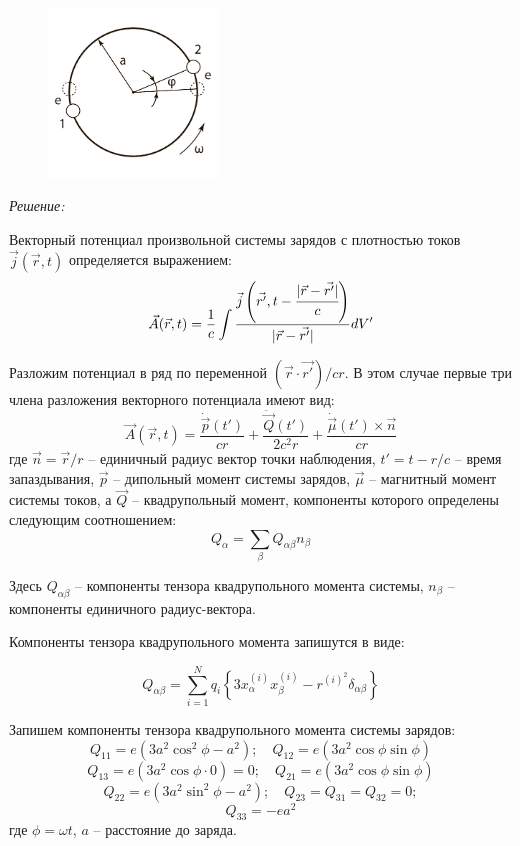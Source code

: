 \begin{figure}[ht]
    \center
	\includegraphics[width=0.4\textwidth]{pdf/02.pdf}
\end{figure}

\emph{Решение:}

Векторный потенциал произвольной системы зарядов с плотностью 
токов \( \vec{j}(\vec{r}, t) \) определяется выражением:
\[ 
	\vec{A}(\vec{r}, t) = \frac{1}{c}\int
	\frac{\vec{j}\left(\vec{r'}, t - \cfrac{|\vec{r}-\vec{r'}|}{c}\right)}
	{|\vec{r} - \vec{r'}|}dV'
\]

Разложим потенциал в ряд по переменной \( (\vec{r}\cdot\vec{r'})/cr \). 
В этом случае первые три члена разложения векторного потенциала имеют вид:
\[
	\vec{A}(\vec{r}, t) = \frac{\dot{\vec{p}}(t')}{cr} + 
	\frac{\ddot{\vec{Q}}(t')}{2c^2 r} + 
	\frac{\dot{\vec{\mu}}(t')\times\vec{n}}{cr}
\]
где \( \vec{n} = \vec{r}/r \) -- единичный радиус вектор точки наблюдения, 
\( t' = t - r/c \) -- время запаздывания, 
\( \vec{p} \) -- дипольный момент системы зарядов,
\( \vec{\mu} \) -- магнитный момент системы токов, а 
\( \vec{Q} \) -- квадрупольный момент, компоненты которого определены 
следующим соотношением:
\[ Q_\alpha = \sum_\beta Q_{\alpha\beta}n_\beta \]

Здесь \( Q_{\alpha\beta} \) -- компоненты тензора квадрупольного момента системы, 
\( n_\beta \) -- компоненты единичного радиус-вектора.

Компоненты тензора квадрупольного момента запишутся в виде:

\[ 
	Q_{\alpha\beta} = \sum_{i=1}^N q_i 
	\left\{ 3x_{\alpha}^{(i)} x_{\beta}^{(i)} - 
	r^{(i)^2}\delta_{\alpha\beta} \right\}
\]

Запишем компоненты тензора квадрупольного момента системы зарядов:
\[ 
	Q_{11} = e\left( 3a^2\cos^2\phi - a^2 \right);\quad
	Q_{12} = e\left( 3a^2\cos\phi\sin\phi \right)
\]
\[ 
	Q_{13} = e\left( 3a^2\cos\phi\cdot 0\right) = 0;\quad
	Q_{21} = e\left( 3a^2\cos\phi\sin\phi \right) 
\]
\[ 
	Q_{22} = e\left( 3a^2\sin^2\phi - a^2 \right);\quad
	Q_{23} = Q_{31} = Q_{32} = 0;
\]
\[ Q_{33} = -ea^2 \]
где \( \phi = \omega t \), \( a \) -- расстояние до заряда.

